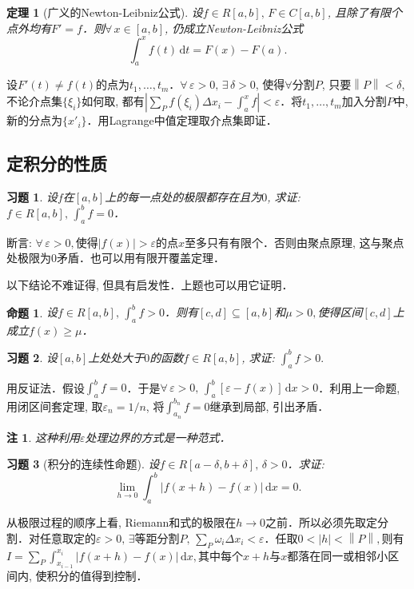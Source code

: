 \documentclass[11pt,a4paper]{ctexart}
\makeatletter
\theoremstyle{thmseries} %
\newtheorem{thm}{定理}[section]
\newtheorem{prop}{命题}[section]
\theoremstyle{exerseries}
\newtheorem{exer}{习题}[section]
\newtheorem*{rem}{注}
\renewenvironment{proof}[1][\proofname]{\par
  \pushQED{\qed}%
  \normalfont \topsep6\p@\@plus6\p@\relax
  \trivlist
  \item[\hskip\labelsep
        \itshape
    #1\@addpunct{}]\ignorespaces
}{%
  \popQED\endtrivlist\@endpefalse
}
\newenvironment{pf}{\begin{proof}[\bfseries\upshape 证\quad]}{\end{proof}}
\renewcommand{\epsilon}{\varepsilon}
\renewcommand{\d}{\mathrm{d}}
\newcommand{\norm}[1]{\left\lVert#1\right\rVert}
\makeatother
\begin{document}
\begin{thm}[广义的Newton-Leibniz公式]
	设$f\in R[a,b],\,F\in C[a,b]$, 且除了有限个点外均有$F'=f$．则$\forall\,x\in[a,b]$, 仍成立Newton-Leibniz公式
	\[\int_{a}^{x}f(t)\,\d t=F(x)-F(a).\]
\end{thm}
\begin{pf}
	设$F'(t)\neq f(t)$的点为$t_1,\dots,t_m$．$\forall\,\epsilon>0,\,\exists\,\delta>0$, 使得$\forall$分割$P$, 只要$\norm{P}<\delta$, 不论介点集$\{\xi_i\}$如何取, 都有$\textstyle\left|\sum_P f(\xi_i)\Delta x_i-\int_{a}^{x}f\right|<\epsilon$．将$t_1,\dots,t_m$加入分割$P$中, 新的分点为$\{x'_i\}$．用Lagrange中值定理取介点集即证．
\end{pf}


\subsection{定积分的性质}
\begin{exer}
	设$f$在$[a,b]$上的每一点处的极限都存在且为$0$, 求证: $f\in R[a,b],\,\int_{a}^{b}f=0$．
\end{exer}
\begin{pf}
	断言: $\forall\,\epsilon>0,$使得$|f(x)|>\epsilon$的点$x$至多只有有限个．否则由聚点原理, 这与聚点处极限为0矛盾．也可以用有限开覆盖定理．
\end{pf}

以下结论不难证得, 但具有启发性．上题也可以用它证明．
\begin{prop}
	设$f\in R[a,b],\,\int_{a}^{b}f>0$．则有$[c,d]\subseteq[a,b]$和$\mu>0,$使得区间$[c,d]$上成立$f(x)\geq\mu$．
\end{prop}

\begin{exer}
	设$[a,b]$上处处大于$0$的函数$f\in R[a,b]$, 求证: $\int_{a}^{b}f>0.$
\end{exer}
\begin{pf}
	用反证法．假设$\int_{a}^{b}f=0$．于是$\forall\,\epsilon>0,\,\int_{a}^{b}[\epsilon-f(x)]\,\d x>0$．利用上一命题, 用闭区间套定理, 取$\epsilon_n=1/n$, 将$\int_{a_n}^{b_n}f=0$继承到局部, 引出矛盾．
\end{pf}
\begin{rem}
	这种利用$\epsilon$处理边界的方式是一种范式．
\end{rem}

\begin{exer}[积分的连续性命题]
	设$f\in R[a-\delta,b+\delta],\,\delta>0$．求证:
	\[\lim_{h\to0}\int_{a}^{b}|f(x+h)-f(x)|\,\d x=0.\]
\end{exer}
\begin{pf}\everymath{\textstyle}
	从极限过程的顺序上看, Riemann和式的极限在$h\to0$之前．所以必须先取定分割．对任意取定的$\epsilon>0,\,\exists$等距分割$P,\,\sum_P \omega_i\Delta x_i<\epsilon$．任取$0<|h|<\norm{P},$则有
	$I=\sum_P \int_{x_{i-1}}^{x_i}|f(x+h)-f(x)|\,\d x,$其中每个$x+h$与$x$都落在同一或相邻小区间内, 使积分的值得到控制．
\end{pf}
\end{document}
